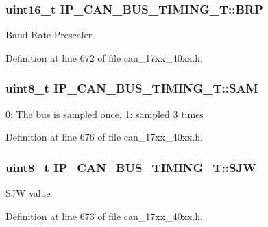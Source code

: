 \subsubsection[{\texorpdfstring{B\+RP}{BRP}}]{\setlength{\rightskip}{0pt plus 5cm}uint16\+\_\+t I\+P\+\_\+\+C\+A\+N\+\_\+\+B\+U\+S\+\_\+\+T\+I\+M\+I\+N\+G\+\_\+\+T\+::\+B\+RP}\hypertarget{structIP__CAN__BUS__TIMING__T_a18fb5e94652c78dd8468b7a374699643}{}\label{structIP__CAN__BUS__TIMING__T_a18fb5e94652c78dd8468b7a374699643}
Baud Rate Prescaler 

Definition at line 672 of file can\+\_\+17xx\+\_\+40xx.\+h.

\subsubsection[{\texorpdfstring{S\+AM}{SAM}}]{\setlength{\rightskip}{0pt plus 5cm}uint8\+\_\+t I\+P\+\_\+\+C\+A\+N\+\_\+\+B\+U\+S\+\_\+\+T\+I\+M\+I\+N\+G\+\_\+\+T\+::\+S\+AM}\hypertarget{structIP__CAN__BUS__TIMING__T_a3313ced0f84d23e3caf050a530119fb9}{}\label{structIP__CAN__BUS__TIMING__T_a3313ced0f84d23e3caf050a530119fb9}
0\+: The bus is sampled once, 1\+: sampled 3 times 

Definition at line 676 of file can\+\_\+17xx\+\_\+40xx.\+h.

\subsubsection[{\texorpdfstring{S\+JW}{SJW}}]{\setlength{\rightskip}{0pt plus 5cm}uint8\+\_\+t I\+P\+\_\+\+C\+A\+N\+\_\+\+B\+U\+S\+\_\+\+T\+I\+M\+I\+N\+G\+\_\+\+T\+::\+S\+JW}\hypertarget{structIP__CAN__BUS__TIMING__T_a6f3d35851d3119d9d04096d08d41d289}{}\label{structIP__CAN__BUS__TIMING__T_a6f3d35851d3119d9d04096d08d41d289}
S\+JW value 

Definition at line 673 of file can\+\_\+17xx\+\_\+40xx.\+h.

